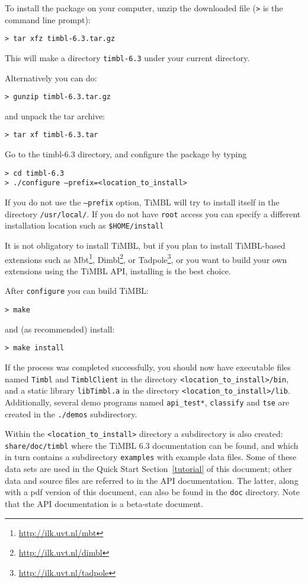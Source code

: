 \documentclass{report}
\begin{document}
To install the package on your computer, unzip the downloaded file ({\tt >} is the command line prompt):

{\tt > tar xfz timbl-6.3.tar.gz}

This will make a directory {\tt timbl-6.3} under your current directory.

Alternatively you can do:

{\tt > gunzip timbl-6.3.tar.gz}

and unpack the tar archive:

{\tt > tar xf timbl-6.3.tar}

Go to the timbl-6.3 directory, and configure the package by typing

{\tt > cd timbl-6.3} \\
{\tt > ./configure --prefix=<location\_to\_install>}

If you do not use the {\tt --prefix} option, TiMBL will try to install itself in the directory {\tt /usr/local/}.  If you do not have {\tt root} access you can specify a different installation location such as {\tt \$HOME/install}

It is not obligatory to install TiMBL, but if you plan to install TiMBL-based extensions such as Mbt\footnote{\url{http://ilk.uvt.nl/mbt}}, Dimbl\footnote{\url{http://ilk.uvt.nl/dimbl}}, or Tadpole\footnote{\url{http://ilk.uvt.nl/tadpole}}, or you want to build your own extensions using the TiMBL API, installing is the best choice.

After {\tt configure} you can build TiMBL:

{\tt > make}

and (as recommended) install:

{\tt > make install }

If the process was completed successfully, you should now have executable files
named {\tt Timbl} and {\tt TimblClient} in the directory 
{\tt <location\_to\_install>/bin}, and a static library {\tt libTimbl.a} in the
 directory {\tt <location\_to\_install>/lib}. Additionally, several demo programs named {\tt api\_test*}, {\tt classify} and {\tt tse}
are created in the {\tt ./demos} subdirectory.

Within the {\tt <location\_to\_install>} directory a subdirectory is also created: {\tt share/doc/timbl} where the TiMBL 6.3 documentation can be found, and which in turn contains a subdirectory {\tt examples} with example data files. Some of these data sets are used in the Quick Start Section~\ref{tutorial} of this document; other data and source files are referred to in the API documentation. The latter, along with a pdf version of this document, can also be found in the {\tt doc} directory. Note that the API documentation is a beta-state document.
\end{document}
